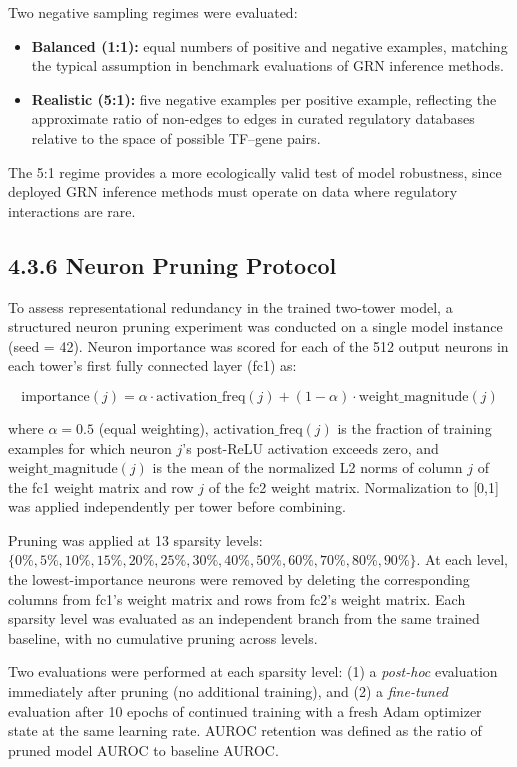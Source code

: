 \documentclass[
  12pt,
]{report}
\providecommand{\tightlist}{%
  \setlength{\itemsep}{0pt}\setlength{\parskip}{0pt}}
\begin{document}
Two negative sampling regimes were evaluated:

\begin{itemize}
\tightlist
\item
  \textbf{Balanced (1:1):} equal numbers of positive and negative
  examples, matching the typical assumption in benchmark evaluations of
  GRN inference methods.
\item
  \textbf{Realistic (5:1):} five negative examples per positive example,
  reflecting the approximate ratio of non-edges to edges in curated
  regulatory databases relative to the space of possible TF--gene pairs.
\end{itemize}

The 5:1 regime provides a more ecologically valid test of model
robustness, since deployed GRN inference methods must operate on data
where regulatory interactions are rare.

\subsection{4.3.6 Neuron Pruning
Protocol}\label{neuron-pruning-protocol}

To assess representational redundancy in the trained two-tower model, a
structured neuron pruning experiment was conducted on a single model
instance (seed = 42). Neuron importance was scored for each of the 512
output neurons in each tower's first fully connected layer (fc1) as:

\[\text{importance}(j) = \alpha \cdot \text{activation\_freq}(j) + (1 - \alpha) \cdot \text{weight\_magnitude}(j)\]

where \(\alpha = 0.5\) (equal weighting), \(\text{activation\_freq}(j)\)
is the fraction of training examples for which neuron \(j\)'s post-ReLU
activation exceeds zero, and \(\text{weight\_magnitude}(j)\) is the mean
of the normalized L2 norms of column \(j\) of the fc1 weight matrix and
row \(j\) of the fc2 weight matrix. Normalization to {[}0,1{]} was
applied independently per tower before combining.

Pruning was applied at 13 sparsity levels:
\(\{0\%, 5\%, 10\%, 15\%, 20\%, 25\%, 30\%,
40\%, 50\%, 60\%, 70\%, 80\%, 90\%\}\). At each level, the
lowest-importance neurons were removed by deleting the corresponding
columns from fc1's weight matrix and rows from fc2's weight matrix. Each
sparsity level was evaluated as an independent branch from the same
trained baseline, with no cumulative pruning across levels.

Two evaluations were performed at each sparsity level: (1) a
\emph{post-hoc} evaluation immediately after pruning (no additional
training), and (2) a \emph{fine-tuned} evaluation after 10 epochs of
continued training with a fresh Adam optimizer state at the same
learning rate. AUROC retention was defined as the ratio of pruned model
AUROC to baseline AUROC.
\end{document}

